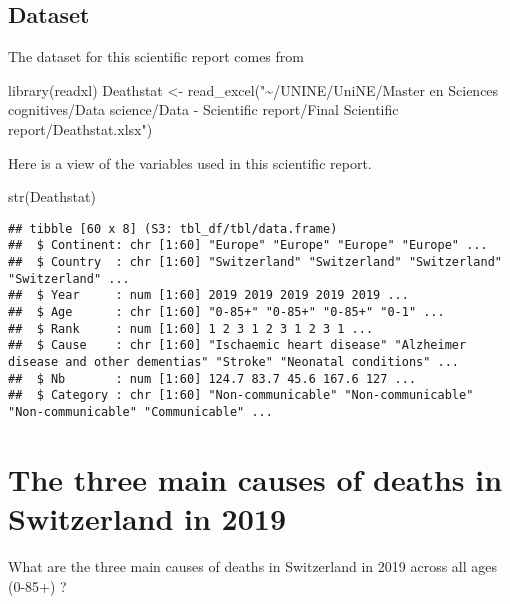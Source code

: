 \documentclass[
]{article}
\newenvironment{Shaded}{\begin{snugshade}}{\end{snugshade}}
\newcommand{\FunctionTok}[1]{\textcolor[rgb]{0.00,0.00,0.00}{#1}}
\newcommand{\NormalTok}[1]{#1}
\newcommand{\OtherTok}[1]{\textcolor[rgb]{0.56,0.35,0.01}{#1}}
\newcommand{\StringTok}[1]{\textcolor[rgb]{0.31,0.60,0.02}{#1}}
\begin{document}
\hypertarget{dataset}{%
\subsection{Dataset}\label{dataset}}

The dataset for this scientific report comes from

\begin{Shaded}
\begin{Highlighting}[]
\FunctionTok{library}\NormalTok{(readxl)}
\NormalTok{Deathstat }\OtherTok{\textless{}{-}} \FunctionTok{read\_excel}\NormalTok{(}\StringTok{"\textasciitilde{}/UNINE/UniNE/Master en Sciences cognitives/Data science/Data {-} Scientific report/Final Scientific report/Deathstat.xlsx"}\NormalTok{)}
\end{Highlighting}
\end{Shaded}

Here is a view of the variables used in this scientific report.

\begin{Shaded}
\begin{Highlighting}[]
\FunctionTok{str}\NormalTok{(Deathstat)}
\end{Highlighting}
\end{Shaded}

\begin{verbatim}
## tibble [60 x 8] (S3: tbl_df/tbl/data.frame)
##  $ Continent: chr [1:60] "Europe" "Europe" "Europe" "Europe" ...
##  $ Country  : chr [1:60] "Switzerland" "Switzerland" "Switzerland" "Switzerland" ...
##  $ Year     : num [1:60] 2019 2019 2019 2019 2019 ...
##  $ Age      : chr [1:60] "0-85+" "0-85+" "0-85+" "0-1" ...
##  $ Rank     : num [1:60] 1 2 3 1 2 3 1 2 3 1 ...
##  $ Cause    : chr [1:60] "Ischaemic heart disease" "Alzheimer disease and other dementias" "Stroke" "Neonatal conditions" ...
##  $ Nb       : num [1:60] 124.7 83.7 45.6 167.6 127 ...
##  $ Category : chr [1:60] "Non-communicable" "Non-communicable" "Non-communicable" "Communicable" ...
\end{verbatim}

\hypertarget{the-three-main-causes-of-deaths-in-switzerland-in-2019}{%
\section{The three main causes of deaths in Switzerland in
2019}\label{the-three-main-causes-of-deaths-in-switzerland-in-2019}}

What are the three main causes of deaths in Switzerland in 2019 across
all ages (0-85+) ?
\end{document}

